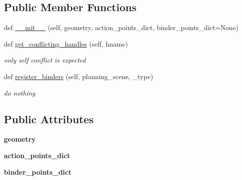 \subsection*{Public Member Functions}
\begin{DoxyCompactItemize}
\item 
def \hyperlink{classrnb-planning_1_1src_1_1pkg_1_1planning_1_1constraint_1_1constraint__object_1_1_custom_object_ac3a0f12c1d793ede64e763fea59d2097}{\+\_\+\+\_\+init\+\_\+\+\_\+} (self, geometry, action\+\_\+points\+\_\+dict, binder\+\_\+points\+\_\+dict=None)
\item 
def \hyperlink{classrnb-planning_1_1src_1_1pkg_1_1planning_1_1constraint_1_1constraint__object_1_1_custom_object_aba29329033ebc4367ba4709691a227d4}{get\+\_\+conflicting\+\_\+handles} (self, hname)
\begin{DoxyCompactList}\small\item\em only self conflict is expected \end{DoxyCompactList}\item 
\mbox{\label{classrnb-planning_1_1src_1_1pkg_1_1planning_1_1constraint_1_1constraint__object_1_1_custom_object_a5cbd29ae9de16a60994540a89c834f12}} 
def \hyperlink{classrnb-planning_1_1src_1_1pkg_1_1planning_1_1constraint_1_1constraint__object_1_1_custom_object_a5cbd29ae9de16a60994540a89c834f12}{register\+\_\+binders} (self, planning\+\_\+scene, \+\_\+type)
\begin{DoxyCompactList}\small\item\em do nothing \end{DoxyCompactList}\end{DoxyCompactItemize}
\subsection*{Public Attributes}
\begin{DoxyCompactItemize}
\item 
\mbox{\label{classrnb-planning_1_1src_1_1pkg_1_1planning_1_1constraint_1_1constraint__object_1_1_custom_object_a03edb8a69175caec488664c011e2458c}} 
{\bfseries geometry}
\item 
\mbox{\label{classrnb-planning_1_1src_1_1pkg_1_1planning_1_1constraint_1_1constraint__object_1_1_custom_object_aa8225590cf33499188423e5db62d3bf1}} 
{\bfseries action\+\_\+points\+\_\+dict}
\item 
\mbox{\label{classrnb-planning_1_1src_1_1pkg_1_1planning_1_1constraint_1_1constraint__object_1_1_custom_object_a8b237d86331f83d167348dc88f117c88}} 
{\bfseries binder\+\_\+points\+\_\+dict}
\end{DoxyCompactItemize}


